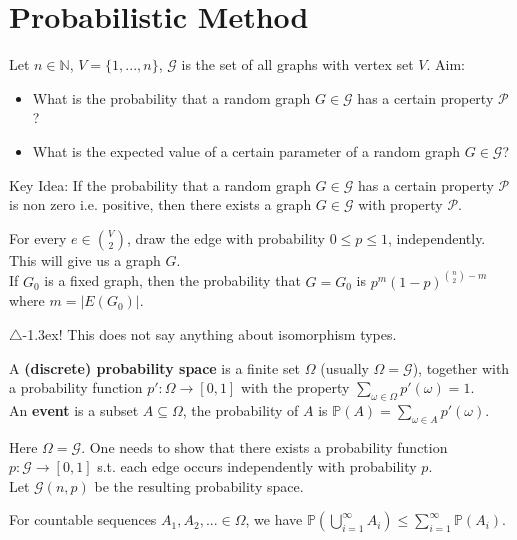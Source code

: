 \section{Probabilistic Method}
\begin{definition*}
    Let $n\in\mathbb{N}$, $V=\{1,...,n\}$, $\mathcal{G}$ is the set of all graphs with vertex set $V$.
    Aim:\begin{itemize}
        \item What is the probability that a random graph $G\in \mathcal{G}$ has a certain property $\mathcal{P}$?
        \item What is the expected value of a certain parameter of a random graph $G\in \mathcal{G}$?
    \end{itemize}
    Key Idea: If the probability that a random graph $G\in \mathcal{G}$ has a certain property $\mathcal{P}$ is non zero i.e. positive, then there exists a graph $G\in \mathcal{G}$ with property $\mathcal{P}$.\par
    For every $e\in \binom{V}{2}$, draw the edge with probability $0\leq p \leq 1$, independently. This will give us a graph $G$.\\
    If $G_0$ is a fixed graph, then the probability that $G=G_0$ is $p^{m}(1-p)^{\binom{n}{2}-m}$ where $m=|E(G_0)|$.\par

    $\bigtriangleup$\kern-1.3ex! This does not say anything about isomorphism types.
\end{definition*}
\begin{definition}\label{7.1}
    A \textbf{(discrete) probability space} is a finite set $\Omega$ (usually $\Omega=\mathcal{G}$), together with a probability function $p':\Omega\rightarrow[0,1]$ with the property $\sum\limits_{\omega\in\Omega}p'(\omega)=1$.\\
    An \textbf{event} is a subset $A\subseteq\Omega$, the probability of $A$ is $\mathbb{P}(A)=\sum\limits_{\omega\in A}p'(\omega)$.\par
    Here $\Omega=\mathcal{G}$. One needs to show that there exists a probability function $p:\mathcal{G}\rightarrow[0,1]$ s.t. each edge occurs independently with probability $p$.\\
    Let $\mathcal{G}(n,p)$ be the resulting probability space. 
\end{definition}
\begin{remark*}\label{7.1r}
    For countable sequences $A_1,A_2,...\in\Omega$, we have $\mathbb{P}(\bigcup\limits_{i=1}^{\infty}A_i)\leq \sum\limits_{i=1}^{\infty}\mathbb{P}(A_i)$.
\end{remark*}
